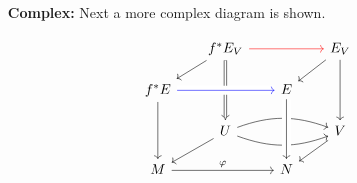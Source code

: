\begin{enumerate}
\begin{enumerate}
          \item[\textbf{Complex:}]
            Next a more complex diagram is shown.

            \begin{equation*}
              \begin{tikzcd}[row sep=scriptsize, column sep=scriptsize]
                & f^* E_V \arrow[dl] \arrow[rr, red] \arrow[dd, Rightarrow] & & E_V \arrow[dl] \arrow[dd] \\
                f^* E \arrow[rr, crossing over, blue] \arrow[dd] & & E \\
                & U \arrow[dl] \arrow[rr, bend left=20] \arrow[rr, bend right=20] & & V \arrow[dl] \\
                M \arrow[rr, "\varphi"] & & N \arrow[from=uu, crossing over]\\
              \end{tikzcd}
            \end{equation*}

        \end{enumerate}

    \end{enumerate}

  \listoftodos

